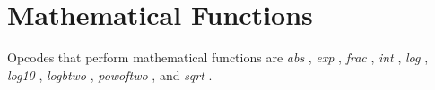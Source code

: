 \begin{comment}
\documentclass[10pt]{article}
\usepackage{fullpage, graphicx, url}
\setlength{\parskip}{1ex}
\setlength{\parindent}{0ex}
\title{Mathematical Functions}



\begin{tabular}{ccc}
The Alternative Csound Reference Manual & & \\
Previous &Mathematical Operations &Next

\end{tabular}

\end{comment}
\section{Mathematical Functions}


  Opcodes that perform mathematical functions are \emph{abs}
, \emph{exp}
, \emph{frac}
, \emph{int}
, \emph{log}
, \emph{log10}
, \emph{logbtwo}
, \emph{powoftwo}
, and \emph{sqrt}
. 


\begin{comment}
\begin{tabular}{lcr}
Previous &Home &Next \\
Arithmetic and Logic Operations &Up &Opcode Equivalents of Functions

\end{tabular}



\end{comment}
